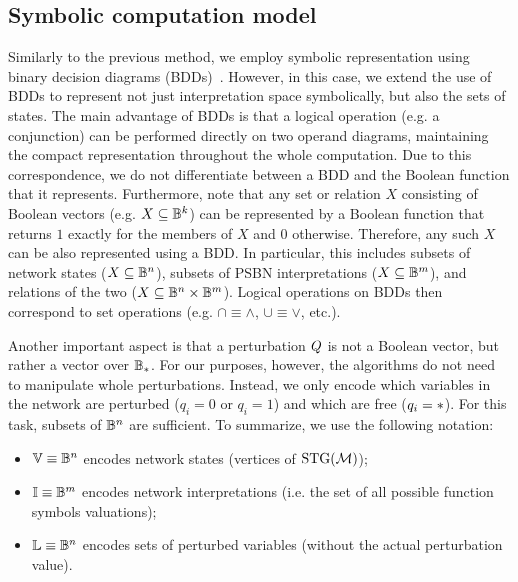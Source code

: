 
\subsection{Symbolic computation model}
\label{ss:symbolic_computation_model}

Similarly to the previous method, we employ symbolic representation using binary decision diagrams (BDDs)~\cite{Bryant86}. However, in this case, we extend the use of BDDs to represent not just interpretation space symbolically, but also the sets of states. The main advantage of BDDs is that a logical operation (e.g. a conjunction) can be performed directly on two operand diagrams, maintaining the compact representation throughout the whole computation. Due to this correspondence, we do not differentiate between a BDD and the Boolean function that it represents. Furthermore, note that any set or relation $X$ consisting of Boolean vectors (e.g. $X \subseteq \mathbb{B}^k$) can be represented by a Boolean function that returns $1$ exactly for the members of $X$ and $0$ otherwise. Therefore, any such $X$ can be also represented using a BDD. In particular, this includes subsets of network states ($X \subseteq \mathbb{B}^n$), subsets of PSBN interpretations ($X \subseteq \mathbb{B}^m$), and relations of the two ($X \subseteq \mathbb{B}^n \times \mathbb{B}^m$). Logical operations on BDDs then correspond to set operations (e.g. $\cap \equiv \land$, $\cup \equiv \lor$, etc.).

Another important aspect is that a perturbation $Q$ is not a Boolean vector, but rather a vector over $\mathbb{B}_{{*}}$. For our purposes, however, the algorithms do not need to manipulate whole perturbations. Instead, we only encode which variables in the network are perturbed ($q_i = 0$ or $q_i = 1$) and which are free ($q_i = {*}$). For this task, subsets of $\mathbb{B}^n$ are sufficient. To summarize, we use the following notation:
\begin{itemize}
	\item $\mathbb{V} \equiv \mathbb{B}^n$ encodes network states (vertices of $\text{\upshape STG}(\mathcal{M})$);
	\item $\mathbb{I} \equiv \mathbb{B}^m$ encodes network interpretations (i.e. the set of all possible function symbols valuations);
	\item $\mathbb{L} \equiv \mathbb{B}^n$ encodes sets of perturbed variables (without the actual perturbation value).
\end{itemize}

